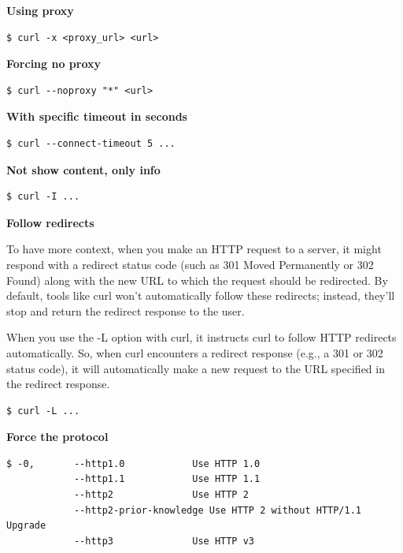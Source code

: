 \documentclass{article}
\newenvironment{codetemplate}[1][]{%
  \mybasecolorbox[#1]
  \itshape
}{%
  \endmybasecolorbox
}
\begin{document}
\textbf{Using proxy}
\begin{codetemplate}{}
\begin{verbatim}
$ curl -x <proxy_url> <url> 
\end{verbatim}
\end{codetemplate}

\textbf{Forcing no proxy}
\begin{codetemplate}{}
\begin{verbatim}
$ curl --noproxy "*" <url>
\end{verbatim}
\end{codetemplate}


\textbf{With specific timeout in seconds}
\begin{codetemplate}{}
\begin{verbatim}
$ curl --connect-timeout 5 ...
\end{verbatim}
\end{codetemplate}

\textbf{Not show content, only info}
\begin{codetemplate}{}
\begin{verbatim}
$ curl -I ...
\end{verbatim}
\end{codetemplate}

\textbf{Follow redirects}

To have more context, when you make an HTTP request to a server, it might respond with a redirect status code (such as 301 Moved Permanently or 302 Found) along with the new URL to which the request should be redirected. By default, tools like curl won't automatically follow these redirects; instead, they'll stop and return the redirect response to the user.

When you use the -L option with curl, it instructs curl to follow HTTP redirects automatically. So, when curl encounters a redirect response (e.g., a 301 or 302 status code), it will automatically make a new request to the URL specified in the redirect response.

\begin{codetemplate}{}
\begin{verbatim}
$ curl -L ...
\end{verbatim}
\end{codetemplate}

\textbf{Force the protocol}
\begin{codetemplate}{}
\begin{verbatim}
$ -0,       --http1.0            Use HTTP 1.0
            --http1.1            Use HTTP 1.1
            --http2              Use HTTP 2
            --http2-prior-knowledge Use HTTP 2 without HTTP/1.1 Upgrade
            --http3              Use HTTP v3
\end{verbatim}
\end{codetemplate}
\end{document}
